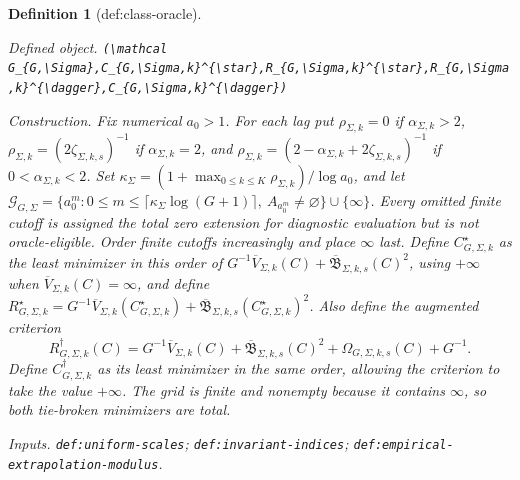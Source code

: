 \documentclass{article}
\newtheorem{definition}{Definition}
\begin{document}
\begin{definition}[def:class-oracle]\label{def:class-oracle}
\par\smallskip\noindent\emph{Defined object.} \texttt{(\textbackslash{}\allowbreak{}mathcal G\_\allowbreak{}\{G,\allowbreak{}\textbackslash{}\allowbreak{}Sigma\}\allowbreak{},\allowbreak{}C\_\allowbreak{}\{G,\allowbreak{}\textbackslash{}\allowbreak{}Sigma,\allowbreak{}k\}\allowbreak{}\textasciicircum{}\{\textbackslash{}\allowbreak{}star\}\allowbreak{},\allowbreak{}R\_\allowbreak{}\{G,\allowbreak{}\textbackslash{}\allowbreak{}Sigma,\allowbreak{}k\}\allowbreak{}\textasciicircum{}\{\textbackslash{}\allowbreak{}star\}\allowbreak{},\allowbreak{}R\_\allowbreak{}\{G,\allowbreak{}\textbackslash{}\allowbreak{}Sigma,\allowbreak{}k\}\allowbreak{}\textasciicircum{}\{\textbackslash{}\allowbreak{}dagger\}\allowbreak{},\allowbreak{}C\_\allowbreak{}\{G,\allowbreak{}\textbackslash{}\allowbreak{}Sigma,\allowbreak{}k\}\allowbreak{}\textasciicircum{}\{\textbackslash{}\allowbreak{}dagger\}\allowbreak{})}
\par\smallskip\noindent\emph{Construction.} Fix numerical \(a_0>1\). For each lag put \(\rho_{\Sigma,k}=0\) if \(\alpha_{\Sigma,k}>2\), \(\rho_{\Sigma,k}=(2\zeta_{\Sigma,k,s})^{-1}\) if \(\alpha_{\Sigma,k}=2\), and \(\rho_{\Sigma,k}=(2-\alpha_{\Sigma,k}+2\zeta_{\Sigma,k,s})^{-1}\) if \(0<\alpha_{\Sigma,k}<2\). Set \(\kappa_\Sigma=(1+\max_{0\le k\le K}\rho_{\Sigma,k})/\log a_0\), and let \(\mathcal G_{G,\Sigma}=\{a_0^m:0\le m\le\lceil\kappa_\Sigma\log(G+1)\rceil,\ A_{a_0^m}\ne\varnothing\}\cup\{\infty\}\). Every omitted finite cutoff is assigned the total zero extension for diagnostic evaluation but is not oracle-eligible. Order finite cutoffs increasingly and place \(\infty\) last. Define \(C_{G,\Sigma,k}^{\star}\) as the least minimizer in this order of \(G^{-1}\overline V_{\Sigma,k}(C)+\overline{\mathfrak B}_{\Sigma,k,s}(C)^2\), using \(+\infty\) when \(\overline V_{\Sigma,k}(C)=\infty\), and define \(R_{G,\Sigma,k}^{\star}=G^{-1}\overline V_{\Sigma,k}(C_{G,\Sigma,k}^{\star})+\overline{\mathfrak B}_{\Sigma,k,s}(C_{G,\Sigma,k}^{\star})^2\). Also define the augmented criterion \[R_{G,\Sigma,k}^{\dagger}(C)=G^{-1}\overline V_{\Sigma,k}(C)+\overline{\mathfrak B}_{\Sigma,k,s}(C)^2+\Omega_{G,\Sigma,k,s}(C)+G^{-1}.\] Define \(C_{G,\Sigma,k}^{\dagger}\) as its least minimizer in the same order, allowing the criterion to take the value \(+\infty\). The grid is finite and nonempty because it contains \(\infty\), so both tie-broken minimizers are total.
\par\smallskip\noindent\emph{Inputs.} \texttt{def:\allowbreak{}uniform-\allowbreak{}scales}; \texttt{def:\allowbreak{}invariant-\allowbreak{}indices}; \texttt{def:\allowbreak{}empirical-\allowbreak{}extrapolation-\allowbreak{}modulus}.
\end{definition}
\end{document}
